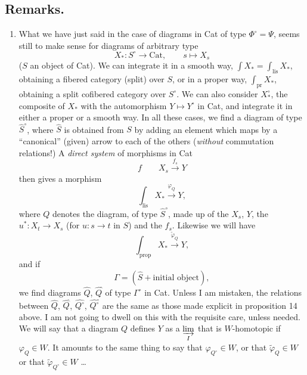 \documentclass[11pt]{article}
\newcommand{\printedpage}[1]{\marginpar{\footnotesize p.~#1}}
\newcommand{\msp}[1]{\marginpar{\footnotesize [#1]}}
\newcommand{\Cat}{\mathrm{Cat}}
\newcommand{\tld}{^{\tilde{}}}
\begin{document}
\subsection*{Remarks.}

\begin{enumerate}
\item[1)] What we have just said in the case of diagrams in Cat of type $\Phi^\circ = \Psi$, seems still to make sense for diagrams of arbitrary type
\[
X_* : S^\circ \longrightarrow \Cat, \qquad s \longmapsto X_s
\]
\printedpage{99}
($S$ an object of Cat). We can integrate it in a smooth way, $\int X_* = \int_{\mathrm{lis}} X_*$, obtaining a fibered category (split) over $S$, or in a proper way, $\int_{\mathrm{pr}} X_*$, obtaining a split cofibered category over $S^\circ$. We can also consider $X_*^\circ$, the composite of $X_*$ with the automorphism $Y \longmapsto Y^\circ$ in Cat, and integrate it in either a proper or a smooth way. In all these cases, we find a diagram of type $\widehat{S}^\circ$, where $\widehat{S}$ is obtained from $S$ by adding an element which maps by a ``canonical'' (given) arrow to each of the others (\textit{without} commutation relations!) A
\msp{page 144}\textit{direct system} of morphisms in Cat
\[
f \qquad X_s \xrightarrow{f_s} Y
\]
then gives a morphism
\[
\int_{\mathrm{lis}} X_* \xrightarrow{\varphi_Q} Y,
\]
where $Q$ denotes the diagram, of type $\widehat{S}^\circ$, made up of the $X_s$, $Y$, the $u^* : X_t \longrightarrow X_s$ (for $u : s \longrightarrow t$ in $S$) and the $f_s$. Likewise we will have
\[
\int_{\mathrm{prop}} X_* \xrightarrow{\tilde{\varphi}_Q} Y,
\]
and if
\[
\Gamma = (\widehat{S} + \text{initial object}),
\]
we find diagrams $\widehat{Q}$, $\widehat{Q}\tld$ of type $\Gamma^\circ$ in Cat. Unless I am mistaken, the relations between $\widehat{Q}$, $\widehat{Q}\tld$, $\widehat{Q^\circ}$, $\widehat{Q^\circ}\tld$ are the same as those made explicit in proposition 14 above. I am not going to dwell on this with the requisite care, unless needed. We will say that a diagram $Q$ defines $Y$ as a $\varinjlim\limits_{I}$ that is $W$-homotopic if $\varphi_Q \in W$. It amounts to the same thing to say that $\varphi_{Q^\circ} \in W$, or that $\tilde{\varphi}_Q \in W$ or that $\tilde{\varphi}_{Q^\circ} \in W$ \dots
\msp{page 145}


\end{enumerate}
\end{document}
